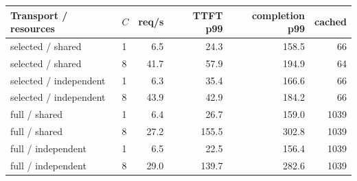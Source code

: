 \begin{tabular}{llrrrr}\toprule
Transport / resources & $C$ & req/s & TTFT p99 & completion p99 & cached\\\midrule
selected / shared & 1 & 6.5 & 24.3 & 158.5 & 66 \\
selected / shared & 8 & 41.7 & 57.9 & 194.9 & 64 \\
selected / independent & 1 & 6.3 & 35.4 & 166.6 & 66 \\
selected / independent & 8 & 43.9 & 42.9 & 184.2 & 66 \\
full / shared & 1 & 6.4 & 26.7 & 159.0 & 1039 \\
full / shared & 8 & 27.2 & 155.5 & 302.8 & 1039 \\
full / independent & 1 & 6.5 & 22.5 & 156.4 & 1039 \\
full / independent & 8 & 29.0 & 139.7 & 282.6 & 1039 \\
\bottomrule\end{tabular}
